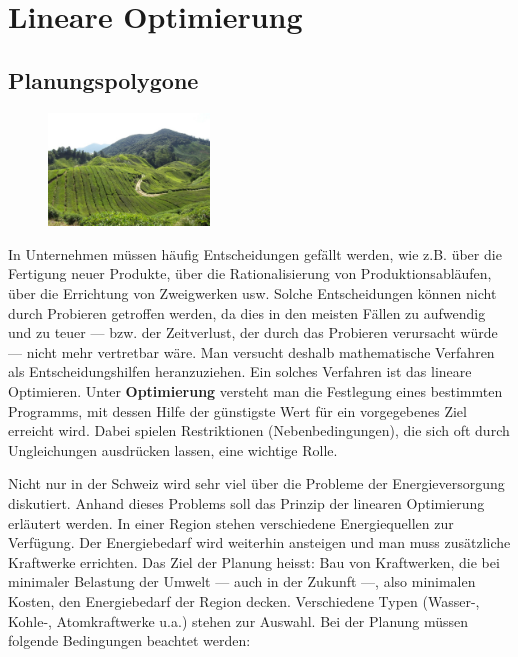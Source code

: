 \documentclass[%
11pt,%
twoside,%
titlepage,%
german,%
headsepline%
]{scrartcl}
\begin{document}
\section{Lineare Optimierung}
\subsection{Planungspolygone}

\begin{figure}
  \begin{center}
    \includegraphics[width=0.382\textwidth]{pictures/tee.JPG}
  \end{center}
\end{figure}
In Unternehmen m\"ussen h\"aufig Entscheidungen gef\"allt werden, wie z.B. \"uber die Fertigung neuer Produkte, \"uber die Rationalisierung von Produktionsabl\"aufen, \"uber die Errichtung von Zweigwerken usw. Solche Entscheidungen k\"onnen nicht durch Probieren getroffen werden, da dies in den meisten F\"allen zu aufwendig und zu teuer --- bzw. der Zeitverlust, der durch das Probieren verursacht w\"urde --- nicht mehr vertretbar w\"are. Man versucht deshalb mathematische Verfahren als Entscheidungshilfen heranzuziehen. Ein solches Verfahren ist das lineare Optimieren. Unter \textbf{Optimierung} versteht man die Festlegung eines bestimmten Programms, mit dessen Hilfe der g\"unstigste Wert f\"ur ein vorgegebenes Ziel erreicht wird. Dabei spielen Restriktionen (Nebenbedingungen), die sich oft durch Ungleichungen ausdr\"ucken lassen, eine wichtige Rolle.

Nicht nur in der Schweiz wird sehr viel \"uber die Probleme der Energieversorgung diskutiert. Anhand dieses Problems soll das Prinzip der linearen Optimierung erl\"autert werden. In einer Region stehen verschiedene Energiequellen zur Verf\"ugung. Der Energiebedarf wird weiterhin ansteigen und man muss zus\"atzliche Kraftwerke errichten. Das Ziel der Planung heisst: Bau von Kraftwerken, die bei minimaler Belastung der Umwelt --- auch in der Zukunft ---, also minimalen Kosten, den Energiebedarf der Region decken. Verschiedene Typen (Wasser-, Kohle-, Atomkraftwerke u.a.) stehen zur Auswahl. Bei der Planung m\"ussen folgende Bedingungen beachtet werden:
\end{document}
